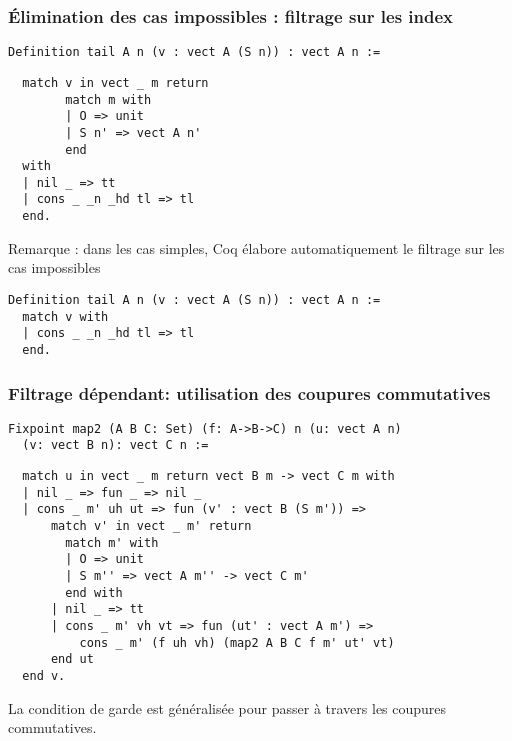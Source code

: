 \documentclass{beamer}
\begin{document}
\begin{frame}[fragile]
  \frametitle{Élimination des cas impossibles : filtrage sur les index}

\begin{verbatim}
Definition tail A n (v : vect A (S n)) : vect A n :=
\end{verbatim}
\pause
\begin{verbatim}
  match v in vect _ m return
        match m with
        | O => unit
        | S n' => vect A n'
        end
  with
  | nil _ => tt
  | cons _ _n _hd tl => tl
  end.
\end{verbatim}

Remarque : dans les cas simples, Coq élabore automatiquement le filtrage sur les cas impossibles

\begin{verbatim}
Definition tail A n (v : vect A (S n)) : vect A n :=
  match v with
  | cons _ _n _hd tl => tl
  end.
\end{verbatim}
\end{frame}

\begin{frame}[fragile]
  \frametitle{Filtrage dépendant: utilisation des coupures commutatives}

\begin{verbatim}
Fixpoint map2 (A B C: Set) (f: A->B->C) n (u: vect A n)
  (v: vect B n): vect C n := 
\end{verbatim}
\pause
\begin{verbatim}
  match u in vect _ m return vect B m -> vect C m with
  | nil _ => fun _ => nil _
  | cons _ m' uh ut => fun (v' : vect B (S m')) =>
      match v' in vect _ m' return
        match m' with
        | O => unit
        | S m'' => vect A m'' -> vect C m'
        end with
      | nil _ => tt
      | cons _ m' vh vt => fun (ut' : vect A m') =>
          cons _ m' (f uh vh) (map2 A B C f m' ut' vt)
      end ut
  end v.
\end{verbatim}

La condition de garde est généralisée pour passer à travers les
coupures commutatives.
\end{frame}
\end{document}
